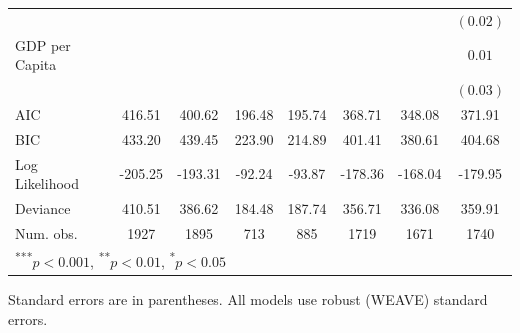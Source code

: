 \documentclass[a4paper]{article}\usepackage[]{graphicx}\usepackage[]{color}
\begin{document}
\begin{table}
\begin{center}
\begin{tabular}{l c c c c c c c }
                        &               &               &              &               &              &              & $(0.02)$    \\
GDP per Capita          &               &               &              &               &              &              & $0.01$      \\
                        &               &               &              &               &              &              & $(0.03)$    \\
\hline
AIC                     & 416.51        & 400.62        & 196.48       & 195.74        & 368.71       & 348.08       & 371.91      \\
BIC                     & 433.20        & 439.45        & 223.90       & 214.89        & 401.41       & 380.61       & 404.68      \\
Log Likelihood          & -205.25       & -193.31       & -92.24       & -93.87        & -178.36      & -168.04      & -179.95     \\
Deviance                & 410.51        & 386.62        & 184.48       & 187.74        & 356.71       & 336.08       & 359.91      \\
Num. obs.               & 1927          & 1895          & 713          & 885           & 1719         & 1671         & 1740        \\
\hline
\multicolumn{8}{l}{\scriptsize{\textsuperscript{***}$p<0.001$, 
  \textsuperscript{**}$p<0.01$, 
  \textsuperscript{*}$p<0.05$}}
\end{tabular}



\end{center}
{\scriptsize{
    Standard errors are in parentheses. All models use robust (WEAVE) standard errors. \\
}}
\end{table}
\end{document}
